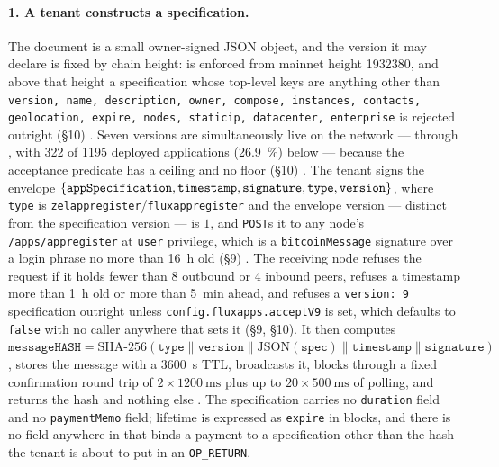 \paragraph{1. A tenant constructs a specification.}
The document is a small owner-signed JSON object, and the version it may declare is fixed by chain
height:  is enforced from mainnet height \num{1932380}, and above that height a
specification whose top-level keys are anything other than
\texttt{version,\allowbreak{} name,\allowbreak{} description,\allowbreak{} owner,\allowbreak{} compose,\allowbreak{} instances,\allowbreak{} contacts,\allowbreak{} geolocation,\allowbreak{} expire,\allowbreak{} nodes,\allowbreak{}
staticip,\allowbreak{} datacenter,\allowbreak{} enterprise} is rejected outright (\S10)
. Seven versions are simultaneously live on the
network ---  through , with \num{322} of \num{1195} deployed applications
(\SI{26.9}{\percent}) below  --- because the acceptance predicate has a ceiling and no floor
(\S10) . The tenant signs the
envelope $\{\texttt{app\allowbreak{}Specification}, \texttt{timestamp}, \texttt{signature}, \texttt{type},
\texttt{version}\}$, where \texttt{type} is \texttt{zelappregister}\slash\texttt{fluxappregister} and the
envelope version --- distinct from the specification version --- is $1$, and \texttt{POST}s it to any
node's \texttt{/\allowbreak{}apps/\allowbreak{}appregister} at \texttt{user} privilege, which is a \texttt{bitcoinMessage}
signature over a login phrase no more than \SI{16}{\hour} old (\S9)
. The receiving node
refuses the request if it holds fewer than $8$ outbound or $4$ inbound peers, refuses a timestamp
more than \SI{1}{\hour} old or more than \SI{5}{\minute} ahead, and refuses a \texttt{version: 9}
specification outright unless \texttt{config.\allowbreak{}fluxapps.\allowbreak{}acceptV9} is set, which defaults to
\texttt{false} with no caller anywhere that sets it (\S9, \S10). It then computes
$\texttt{messageHASH} = \mathrm{SHA\text{-}256}(\texttt{type} \| \texttt{version} \|
\mathrm{JSON}(\texttt{spec}) \| \texttt{timestamp} \| \texttt{signature})$, stores the message with a
\SI{3600}{\second} TTL, broadcasts it, blocks through a fixed confirmation round trip of
$2 \times \SI{1200}{\milli\second}$ plus up to $20 \times \SI{500}{\milli\second}$ of polling, and
returns the hash and nothing else .
The specification carries no \texttt{duration} field and no \texttt{paymentMemo} field; lifetime is
expressed as \texttt{expire} in blocks, and there is no field anywhere in  that binds a
payment to a specification other than the hash the tenant is about to put in an
\texttt{OP\_RETURN}.

